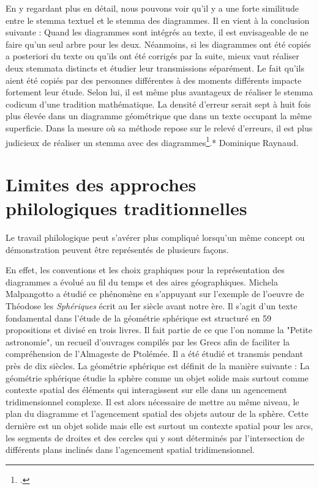 \documentclass[a4paper,12pt,twoside]{book}
\begin{document}
	
	En y regardant plus en détail, nous pouvons voir qu'il y a une forte similitude entre le stemma textuel et le stemma des diagrammes. Il en vient à la conclusion suivante : Quand les diagrammes sont intégrés au texte, il est envisageable de ne faire qu'un seul arbre pour les deux. Néanmoins, si les diagrammes ont été copiés a posteriori du texte ou qu'ils ont été corrigés par la suite, mieux vaut réaliser deux stemmata distincts et étudier leur transmissions séparément. Le fait qu'ils aient été copiés par des personnes différentes à des moments différents impacte fortement leur étude. Selon lui, il est même plus avantageux de réaliser le stemma codicum d'une tradition mathématique. La densité d'erreur serait sept à huit fois plus élevée dans un diagramme géométrique que dans un texte occupant la même superficie. Dans la mesure où sa méthode repose sur le relevé d'erreurs, il est plus judicieux de réaliser un stemma avec des diagrammes\footcite{raynaudBuildingStemmaCodicum2014}.* Dominique Raynaud.
	
	
	\section{Limites des approches philologiques traditionnelles}
	
	
	Le travail philologique peut s'avérer plus compliqué lorsqu'un même concept ou démonstration peuvent être représentés de plusieurs façons.
		
	En effet, les conventions et les choix graphiques pour la représentation des diagrammes a évolué au fil du temps et des aires géographiques. Michela Malpangotto a étudié ce phénomène en s'appuyant sur l'exemple de l'oeuvre de Théodose les \textit{Sphériques} écrit au Ier siècle avant notre ère. Il s'agit d'un texte fondamental dans l'étude de la géométrie sphérique est structuré en 59 propositions et divisé en trois livres. Il fait partie de ce que l'on nomme la "Petite astronomie", un recueil d'ouvrages compilés par les Grecs afin de faciliter la compréhension de l'Almageste de Ptolémée. Il a été étudié et transmis pendant près de dix siècles. La géométrie sphérique est définit de la manière suivante : \og La géométrie sphérique étudie la sphère comme un objet solide mais surtout comme contexte spatial des éléments qui interagissent sur elle dans un agencement tridimensionnel complexe. \fg Il est alors nécessaire de mettre au même niveau, le plan du diagramme et l'agencement spatial des objets autour de la sphère. Cette dernière est un objet solide mais elle est surtout un contexte spatial pour les arcs, les segments de droites et des cercles qui y sont déterminés par l'intersection de différents plans inclinés dans l'agencement spatial tridimensionnel. 
	
\end{document}

